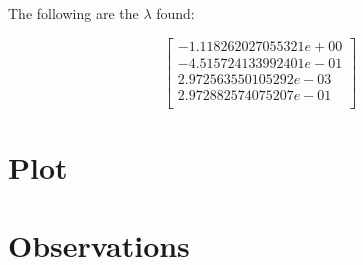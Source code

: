 \documentclass{article}
\begin{document}
The following are the $\lambda$ found:

$$
\begin{bmatrix}
-1.118262027055321e+00\\
-4.515724133992401e-01\\
2.972563550105292e-03\\
2.972882574075207e-01\\
\end{bmatrix}
$$

\section{Plot}
\section{Observations}
\end{document}
